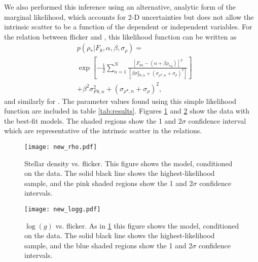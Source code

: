We also performed this inference using an alternative, analytic form of the
marginal likelihood, which accounts for 2-D uncertainties but does not allow
the intrinsic scatter to be a function of the dependent or independent
variables.
For the relation between flicker and \rhostar, this likelihood function can be
written as
\begin{eqnarray}
	& p(\rho_*| F_8, \alpha, \beta, \sigma_{\rho}) =  \\ \nonumber
						      & \exp \left[-\frac{1}{2}
		\sum_{n=1}^N \frac{[F_{8n}-(\alpha + \beta \rho_{*n})]^2}
	{\left[\beta \sigma_{F8, n}^2 + (\sigma_{\rho *, n}
	+ \sigma_{\rho})^2\right]}\right]
	\\ \nonumber
	& + \beta^2 \sigma_{F8, n}^2 + (\sigma_{\rho *, n} + \sigma_{\rho})^2,
\end{eqnarray}
\label{eq:likelihood}
and similarly for \logg.
The parameter values found using this simple likelihood function are included
in table \ref{tab:results}.
Figures \ref{fig:rhostar} and \ref{fig:logg} show the data with the best-fit
models.
The shaded regions show the 1 and 2$\sigma$ confidence interval which are
representative of the intrinsic scatter in the relations.

\begin{figure}
\begin{center}
\texttt{[image: new\_rho.pdf]}
\caption{
Stellar density vs. flicker.
This figure shows the model, conditioned on the data.
The solid black line shows the highest-likelihood sample, and the pink shaded
regions show the 1 and 2$\sigma$ confidence intervals.}
\label{fig:rhostar}
\end{center}
\end{figure}

\begin{figure}
\begin{center}
\texttt{[image: new\_logg.pdf]}
\caption{
$\log(g)$ vs. flicker.
As in \ref{fig:rhostar} this figure shows the model, conditioned on the data.
The solid black line shows the highest-likelihood sample, and the blue shaded
regions show the 1 and 2$\sigma$ confidence intervals.}
\label{fig:logg}
\end{center}
\end{figure}

